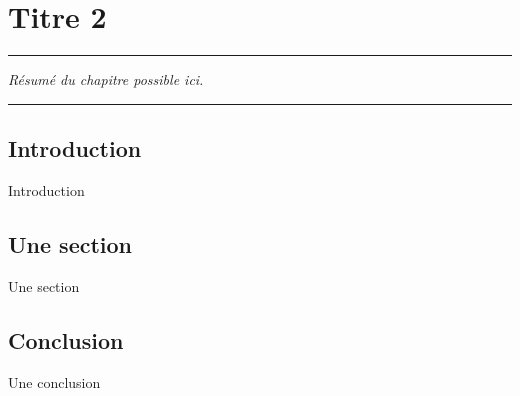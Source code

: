 
\lhead[\fancyplain{}{\leftmark}]%
{\fancyplain{}{}} %
\chead[\fancyplain{}{}]%
{\fancyplain{}{}}
\rhead[\fancyplain{}{}]%
{\fancyplain{}{\rightmark}}%
\lfoot[\fancyplain{}{}]%
{\fancyplain{}{}}
\cfoot[\fancyplain{}{\thepage}]%
{\fancyplain{}{\thepage}} %
\rfoot[\fancyplain{}{}]%
{\fancyplain{}{\scriptsize}}



\chapter{Titre 2}
\label{ch:2}


\begin{center}
	\rule{0.7\linewidth}{.5pt}
	\begin{minipage}{0.7\linewidth}
		\smallskip
		
		\textit{Résumé du chapitre possible ici.
		}
		
	\end{minipage}
	\smallskip
	\rule{0.7\linewidth}{.5pt}
\end{center}

\minitoc
\newpage

\section{Introduction}

Introduction

\section{Une section}

Une section

\section{Conclusion}

Une conclusion